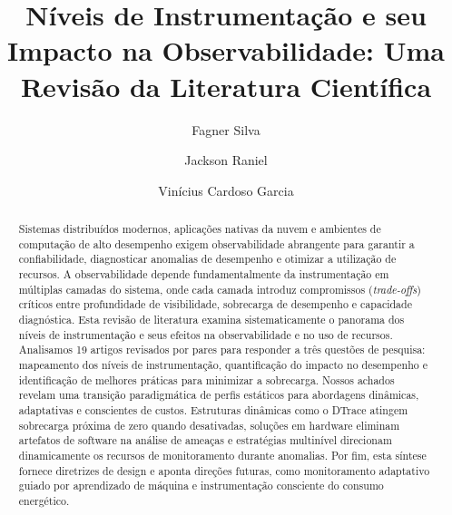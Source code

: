 \documentclass[sigconf, anonymous]{acmart}
\begin{document}
\title{Níveis de Instrumentação e seu Impacto na Observabilidade: Uma Revisão da Literatura Científica}

\author{Fagner Silva}

\author{Jackson Raniel}

\author{Vinícius Cardoso Garcia}

\renewcommand{\shortauthors}{Silva et al.}
\renewcommand{\shorttitle}{Níveis de Instrumentação e seu Impacto na Observabilidade}

\frenchspacing

\begin{abstract}
Sistemas distribuídos modernos, aplicações nativas da nuvem e ambientes de computação de alto desempenho exigem observabilidade abrangente para garantir a confiabilidade, diagnosticar anomalias de desempenho e otimizar a utilização de recursos. A observabilidade depende fundamentalmente da instrumentação em múltiplas camadas do sistema, onde cada camada introduz compromissos (\textit{trade-offs}) críticos entre profundidade de visibilidade, sobrecarga de desempenho e capacidade diagnóstica. Esta revisão de literatura examina sistematicamente o panorama dos níveis de instrumentação e seus efeitos na observabilidade e no uso de recursos. Analisamos 19 artigos revisados por pares para responder a três questões de pesquisa: mapeamento dos níveis de instrumentação, quantificação do impacto no desempenho e identificação de melhores práticas para minimizar a sobrecarga. Nossos achados revelam uma transição paradigmática de perfis estáticos para abordagens dinâmicas, adaptativas e conscientes de custos. Estruturas dinâmicas como o DTrace atingem sobrecarga próxima de zero quando desativadas, soluções em hardware eliminam artefatos de software na análise de ameaças e estratégias multinível direcionam dinamicamente os recursos de monitoramento durante anomalias. Por fim, esta síntese fornece diretrizes de design e aponta direções futuras, como monitoramento adaptativo guiado por aprendizado de máquina e instrumentação consciente do consumo energético.
\end{abstract}

\end{document}
